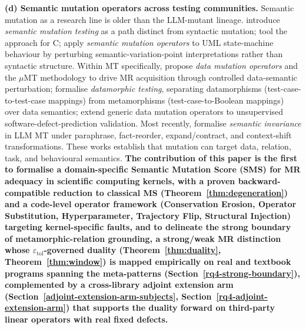 \documentclass[manuscript,screen,review]{acmart}
\begin{document}
\textbf{(d) Semantic mutation operators across testing communities.}
Semantic mutation as a research line is older than the LLM-mutant
lineage. \citet{7a6c280d9584691800e71876c716ea229335abeb} introduce \emph{semantic
mutation testing} as a path distinct from syntactic mutation; \citet{dan2012smtc}
tool the approach for C; \citet{derezinska2019uml}
apply \emph{semantic mutation operators} to UML state-machine behaviour
by perturbing semantic-variation-point interpretations rather than
syntactic structure. Within MT specifically, \citet{sun2016mumt,sun2024datamutation}
propose \emph{data mutation operators} and the $\mu$MT methodology to drive
MR acquisition through controlled data-semantic perturbation; \citet{zhu2020datamorphic}
formalise \emph{datamorphic testing}, separating
datamorphisms (test-case-to-test-case mappings) from metamorphisms
(test-case-to-Boolean mappings) over data semantics; \citet{chan2024metamorphic}
extend generic data mutation operators to unsupervised
software-defect-prediction validation. Most recently, \citet{0fa97cc4e2a0ffb6a777669b1b541c0372fac0d2}
formalise \emph{semantic invariance} in LLM MT under paraphrase,
fact-reorder, expand/contract, and context-shift transformations. These
works establish that mutation can target data, relation, task, and
behavioural semantics. \textbf{The contribution of this paper is the
first to formalise a domain-specific Semantic Mutation Score (SMS) for
MR adequacy in scientific computing kernels, with a proven
backward-compatible reduction to classical MS (Theorem~\ref{thm:degeneration}) and a
code-level operator framework (Conservation Erosion, Operator
Substitution, Hyperparameter, Trajectory Flip, Structural Injection)
targeting kernel-specific faults, and to delineate the strong boundary
of metamorphic-relation grounding, a strong/weak MR distinction whose
$\varepsilon_{\mathrm{tol}}$-governed duality (Theorem~\ref{thm:duality}, Theorem~\ref{thm:window})
is mapped empirically on real and textbook programs spanning the
meta-patterns (Section~\ref{rq4-strong-boundary}), complemented by a cross-library adjoint extension
arm (Section~\ref{adjoint-extension-arm-subjects}, Section~\ref{rq4-adjoint-extension-arm}) that supports the duality forward on third-party
linear operators with real fixed defects.}
\end{document}
